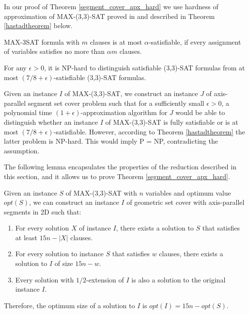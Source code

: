 In our proof of Theorem \ref{segment_cover_apx_hard} we use
hardness of approximation of MAX-(3,3)-SAT proved
in \cite{hastad} and described in
Theorem \ref{hastadtheorem} below.

\begin{defi}
MAX-3SAT formula with $m$ clauses is at most $\alpha$-satisfiable, if
every assignment of variables satisfies no more than $\alpha m$
clauses. 
\end{defi}

\begin{tw}{
	\label{hastadtheorem}
	\textbf{\cite{hastad}}
	For any $\epsilon > 0$, it is NP-hard to distinguish satisfiable
	\linebreak
	(3,3)-SAT formulas from
	at most
	\mbox{$(7/8 + \epsilon)$-satisfiable}
	(3,3)-SAT formulas.
}\end{tw}


Given an instance $I$ of MAX-(3,3)-SAT,
we construct an instance $J$ of 
axis-parallel segment set cover problem
such that for a sufficiently small $\epsilon > 0$,
a polynomial time $(1+\epsilon)$-approximation algorithm for $J$
would be able to distinguish  whether an instance $I$ of MAX-(3,3)-SAT
is fully satisfiable
or is at most $(7/8 + \epsilon)$-satisfiable.
However, according to Theorem \ref{hastadtheorem} the latter problem
is NP-hard.
This would imply P = NP, contradicting the assumption.

The following lemma encapsulates the properties
of the reduction described in this section,
and it allows us to prove Theorem \ref{segment_cover_apx_hard}.

\begin{lemma}{
	\label{apxconstruction}
	Given an instance $S$ of  MAX-(3,3)-SAT 
	with $n$ variables and optimum value $opt(S)$,
	we can construct an instance $I$ of geometric set cover with
	axis-parallel segments in 2D such that:
	\begin{enumerate}[label={(\arabic*)}]
	\item For every solution $X$ of instance $I$,
	there exists a solution to $S$ that satisfies at least  $15n - |X|$
	clauses.
	
	\item For every solution to instance $S$ that satisfies $w$ clauses,
	there exists a solution to $I$ of size $15n - w$.
	
	\item \label{lemma:apxconstruction:enumerate:extension}
	Every solution with $1/2$-extension of $I$
	is also a solution to the original instance $I$.
\end{enumerate}
Therefore, the optimum size of a solution to $I$
is $opt(I) = 15n - opt(S)$. 
	
}\end{lemma}

